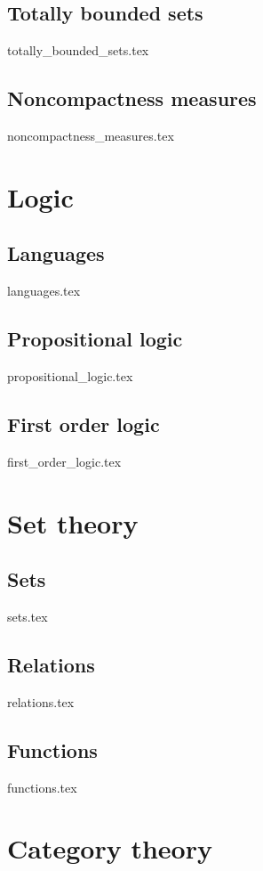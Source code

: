 \documentclass[numbers=endperiod, bibliography=totocnumbered]{scrartcl}
\begin{document}
\subsection{Totally bounded sets}\label{sec:totally_bounded_sets}
{totally_bounded_sets.tex}
\subsection{Noncompactness measures}\label{sec:noncompactness_measures}
{noncompactness_measures.tex}

\section{Logic}\label{sec:logic}
\subsection{Languages}\label{sec:languages}
{languages.tex}
\subsection{Propositional logic}\label{sec:propositional_logic}
{propositional_logic.tex}
\subsection{First order logic}\label{sec:first_order_logic}
{first_order_logic.tex}

\section{Set theory}\label{sec:set_theory}
\subsection{Sets}\label{sec:sets}
{sets.tex}
\subsection{Relations}\label{sec:relations}
{relations.tex}
\subsection{Functions}\label{sec:functions}
{functions.tex}

\section{Category theory}\label{sec:category_theory}
\end{document}
